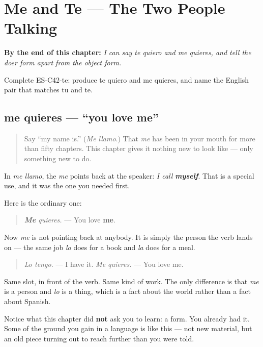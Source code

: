 
\chapter{Me and Te --- The Two People Talking}
\label{ch:pronoun-me-te}

\begin{chapteropening}
\textbf{By the end of this chapter:} \emph{I can say te quiero and me quieres, and tell the doer form apart from the object form.}

Complete ES-C42-te: produce te quiero and me quieres, and name the English pair that matches tu and te.
\end{chapteropening}

\section[me quieres]{me quieres — \textquotedblleft{}you love me\textquotedblright{}}

\label{lesson:ES-C42-me-objeto}



\begin{quote}
Say \textquotedblleft{}my name is.\textquotedblright{} (\emph{Me llamo}.) That \emph{me} has been in your mouth for more than fifty chapters. This chapter gives it nothing new to look like — only something new to do.
\end{quote}

\begin{grammarlens}[title={Grammar Lens: the same word, a simpler job}]
In \emph{me llamo}, the \emph{me} points back at the speaker: \emph{I call \textbf{myself}}. That is a special use, and it was the one you needed first.

Here is the ordinary one:

\begin{quote}
\emph{\textbf{Me} quieres.} — You love \textbf{me}.
\end{quote}

Now \emph{me} is not pointing back at anybody. It is simply the person the verb lands on — the same job \emph{lo} does for a book and \emph{la} does for a meal.

\begin{quote}
\emph{Lo tengo.} — I have it. \emph{Me quieres.} — You love me.
\end{quote}

Same slot, in front of the verb. Same kind of work. The only difference is that \emph{me} is a person and \emph{lo} is a thing, which is a fact about the world rather than a fact about Spanish.

Notice what this chapter did \textbf{not} ask you to learn: a form. You already had it. Some of the ground you gain in a language is like this — not new material, but an old piece turning out to reach further than you were told.
\end{grammarlens}


